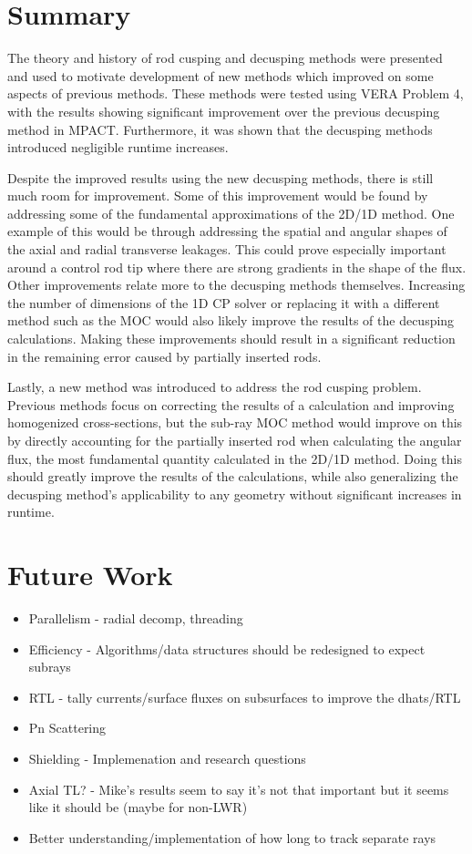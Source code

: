 \section{Summary}

The theory and history of rod cusping and decusping methods were presented and used to motivate development of new methods which improved on some aspects of previous methods.  These methods were tested using VERA Problem 4, with the results showing significant improvement over the previous decusping method in MPACT.  Furthermore, it was shown that the decusping methods introduced negligible runtime increases.

Despite the improved results using the new decusping methods, there is still much room for improvement.  Some of this improvement would be found by addressing some of the fundamental approximations of the 2D/1D method.  One example of this would be through addressing the spatial and angular shapes of the axial and radial transverse leakages.  This could prove especially important around a control rod tip where there are strong gradients in the shape of the flux.  Other improvements relate more to the decusping methods themselves.  Increasing the number of dimensions of the 1D CP solver or replacing it with a different method such as the MOC would also likely improve the results of the decusping calculations.  Making these improvements should result in a significant reduction in the remaining error caused by partially inserted rods.

Lastly, a new method was introduced to address the rod cusping problem.  Previous methods focus on correcting the results of a calculation and improving homogenized cross-sections, but the sub-ray MOC method would improve on this by directly accounting for the partially inserted rod when calculating the angular flux, the most fundamental quantity calculated in the 2D/1D method.  Doing this should greatly improve the results of the calculations, while also generalizing the decusping method's applicability to any geometry without significant increases in runtime.

\section{Future Work}

\begin{itemize}
    \item Parallelism - radial decomp, threading
    \item Efficiency - Algorithms/data structures should be redesigned to expect subrays
    \item RTL - tally currents/surface fluxes on subsurfaces to improve the dhats/RTL
    \item Pn Scattering
    \item Shielding - Implemenation and research questions
    \item Axial TL? - Mike's results seem to say it's not that important but it seems like it should be (maybe for non-LWR)
    \item Better understanding/implementation of how long to track separate rays
\end{itemize}